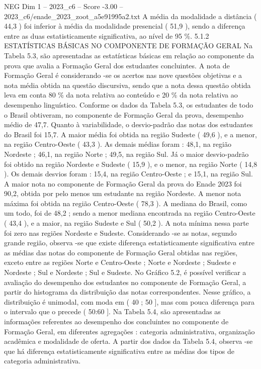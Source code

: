\begin{textsample}{NEG Dim 1 – 2023\_c6 – Score -3.00 – 2023\_c6/enade\_2023\_zoot\_a5e91995a2.txt}
A média da modalidade a distância ( 44,3 ) foi inferior à média da modalidade presencial ( 51,9 ), sendo a diferença entre as duas estatisticamente significativa, ao nível de 95 \%. 5.1.2 ESTATÍSTICAS BÁSICAS NO COMPONENTE DE FORMAÇÃO GERAL Na Tabela 5.3, são apresentadas as estatísticas básicas em relação ao componente da prova que avalia a Formação Geral dos estudantes concluintes.
A nota de Formação Geral é considerando -se os acertos nas nove questões objetivas e a nota média obtida na questão discursiva, sendo que a nota dessa questão obtida leva em conta 80 \% da nota relativa ao conteúdo e 20 \% da nota relativa ao desempenho linguístico.
Conforme os dados da Tabela 5.3, os estudantes de todo o Brasil obtiveram, no componente de Formação Geral da prova, desempenho médio de 47,7.
Quanto à variabilidade, o desvio-padrão das notas dos estudantes do Brasil foi 15,7.
A maior média foi obtida na região Sudeste ( 49,6 ), e a menor, na região Centro-Oeste ( 43,3 ).
As demais médias foram : 48,1, na região Nordeste ; 46,1, na região Norte ; 49,5, na região Sul.
Já o maior desvio-padrão foi obtido na região Nordeste e Sudeste ( 15,9 ), e o menor, na região Norte ( 14,8 ).
Os demais desvios foram : 15,4, na região Centro-Oeste ; e 15,1, na região Sul.
A maior nota no componente de Formação Geral da prova do Enade 2023 foi 90,2, obtida por pelo menos um estudante na região Nordeste.
A menor nota máxima foi obtida na região Centro-Oeste ( 78,3 ).
A mediana do Brasil, como um todo, foi de 48,2 ; sendo a menor mediana encontrada na região Centro-Oeste ( 43,4 ), e a maior, na região Sudeste e Sul ( 50,2 ).
A nota mínima nessa parte foi zero nas regiões Nordeste e Sudeste.
Considerando -se as notas, segundo grande região, observa -se que existe diferença estatisticamente significativa entre as médias das notas do componente de Formação Geral obtidas nas regiões, exceto entre as regiões Norte e Centro-Oeste ; Norte e Nordeste ; Sudeste e Nordeste ; Sul e Nordeste ; Sul e Sudeste.
No Gráfico 5.2, é possível verificar a avaliação do desempenho dos estudantes no componente de Formação Geral, a partir do histograma da distribuição das notas correspondentes.
Nesse gráfico, a distribuição é unimodal, com moda em ( 40 ; 50 ], mas com pouca diferença para o intervalo que o precede ( 50:60 ].
Na Tabela 5.4, são apresentadas as informações referentes ao desempenho dos concluintes no componente de Formação Geral, em diferentes agregações : categoria administrativa, organização acadêmica e modalidade de oferta.
A partir dos dados da Tabela 5.4, observa -se que há diferença estatisticamente significativa entre as médias dos tipos de categoria administrativa.

\end{textsample}
